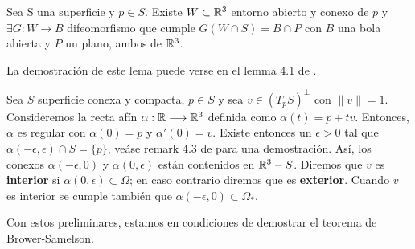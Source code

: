 \begin{lemma}
Sea S una superficie y $p \in S$. Existe $W \subset \mathbb{R}^3$ entorno abierto y conexo de $p$ y $\exists G: W \longrightarrow B$ difeomorfismo que cumple $G(W\cap S) = B\cap P$ con $B$ una bola abierta y $P$ un plano, ambos de $\mathbb{R}^3$.
\end{lemma}

La demostración de este lema puede verse en el lemma 4.1 de \cite{montielrosbook}.

\begin{definition}
Sea $S$ superficie conexa y compacta, $p \in S$ y sea $v \in (T_pS)^{\perp}$ con $\lVert v\rVert=1$. Consideremos la recta afín $\alpha: \mathbb{R} \longrightarrow \mathbb{R}^3$ definida como $\alpha(t) = p + tv$. Entonces, $\alpha$ es regular con $\alpha(0)=p$ y $\alpha'(0) = v$. Existe entonces un $\epsilon  >  0$ tal que $\alpha(-\epsilon, \epsilon) \cap S = \{p\}$, veáse remark 4.3 de \cite{montielrosbook} para una demostración. Así, los conexos $\alpha(-\epsilon, 0)$ y $\alpha(0, \epsilon)$ están contenidos en $\mathbb{R}^3 - S$. Diremos que $v$ es \textbf{interior} si $\alpha(0, \epsilon) \subset \Omega$; en caso contrario diremos que es \textbf{exterior}. Cuando $v$ es interior se cumple también que $\alpha(-\epsilon, 0) \subset \Omega_*$.
\end{definition}

Con estos preliminares, estamos en condiciones de demostrar el teorema de Brower-Samelson.


